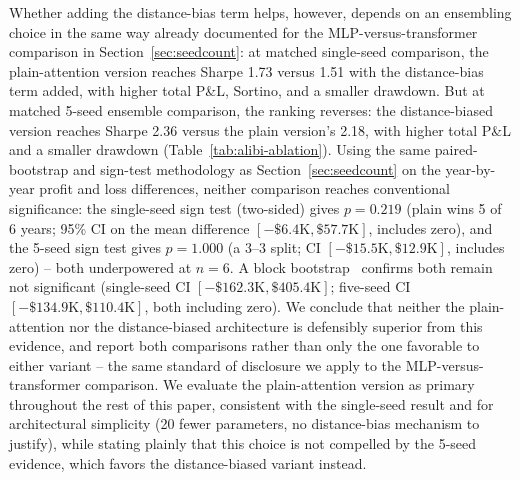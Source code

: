 \documentclass[sigconf,review]{acmart}
\begin{document}
Whether adding the distance-bias term helps, however, depends on an ensembling choice in the same way already documented for the MLP-versus-transformer comparison in Section~\ref{sec:seedcount}: at matched single-seed comparison, the plain-attention version reaches Sharpe 1.73 versus 1.51 with the distance-bias term added, with higher total P\&L, Sortino, and a smaller drawdown. But at matched 5-seed ensemble comparison, the ranking reverses: the distance-biased version reaches Sharpe 2.36 versus the plain version's 2.18, with higher total P\&L and a smaller drawdown (Table~\ref{tab:alibi-ablation}). Using the same paired-bootstrap and sign-test methodology as Section~\ref{sec:seedcount} on the year-by-year profit and loss differences, neither comparison reaches conventional significance: the single-seed sign test (two-sided) gives $p=0.219$ (plain wins 5 of 6 years; 95\% CI on the mean difference $[-\$6.4\text{K}, \$57.7\text{K}]$, includes zero), and the 5-seed sign test gives $p=1.000$ (a 3--3 split; CI $[-\$15.5\text{K}, \$12.9\text{K}]$, includes zero) -- both underpowered at $n=6$. A block bootstrap~\cite{kunsch1989} confirms both remain not significant (single-seed CI $[-\$162.3\text{K}, \$405.4\text{K}]$; five-seed CI $[-\$134.9\text{K}, \$110.4\text{K}]$, both including zero). We conclude that neither the plain-attention nor the distance-biased architecture is defensibly superior from this evidence, and report both comparisons rather than only the one favorable to either variant -- the same standard of disclosure we apply to the MLP-versus-transformer comparison. We evaluate the plain-attention version as primary throughout the rest of this paper, consistent with the single-seed result and for architectural simplicity (20 fewer parameters, no distance-bias mechanism to justify), while stating plainly that this choice is not compelled by the 5-seed evidence, which favors the distance-biased variant instead.

\begin{table}[t]
\centering
\footnotesize
{}
\caption{Matched seed-count comparison, identical protocol otherwise (same features, folds, val-loss checkpointing, calibration, and $p\ge0.5$ selection rule): plain attention wins at single-seed, the distance-biased variant wins at 5-seed ensemble, and neither difference is statistically significant (main text).}
\label{tab:alibi-ablation}
\end{table}
\end{document}

